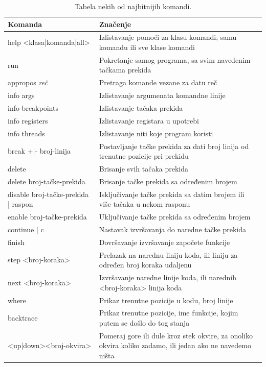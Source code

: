 \documentclass[a4paper]{article}
\begin{document}
\begin{table}[!h!]
\begin{center}
\caption{Tabela nekih od najbitnijih komandi.}
\begin{tabular}{|p{4cm}|p{6cm}|} \hline
Komanda & Značenje\\ \hline
help <klasa|komanda|all> & Izlistavanje pomoći za klasu komandi, samu komandu ili sve klase komandi\\ \hline
run & Pokretanje samog programa, sa svim navedenim tačkama prekida \\ \hline
appropos \textit{reč} & Pretraga komande vezane za datu reč\\ \hline
info args & Izlistavanje argumenata komandne linije \\ \hline
info breakpoints & Izlistavanje tačaka prekida \\ \hline
info registers & Izlistavanje registara u upotrebi \\ \hline
info threads & Izlistavanje niti koje program koristi \\ \hline
break +|- broj-linija & Postavljanje tačke prekida za dati broj linija od trenutne pozicije pri prekidu \\ \hline
delete & Brisanje svih tačaka prekida \\ \hline
delete broj-tačke-prekida & Brisanje tačke prekida sa određenim brojem \\ \hline
disable broj-tačke-prekida | raspon & Isključivanje tačke prekida sa datim brojem ili više tačaka u nekom rasponu \\ \hline
enable broj-tačke-prekida & Uključivanje tačke prekida sa određenim brojem \\ \hline
continue | c & Nastavak izvršavanja do naredne tačke prekida \\ \hline
finish & Dovršavanje izvršavanje započete funkcije \\ \hline
step <broj-koraka> & Prelazak na narednu liniju koda, ili liniju za određen broj koraka udaljenu \\ \hline
next <broj-koraka> & Izvršavanje naredne linije koda, ili narednih <broj-koraka> linija koda \\ \hline
where & Prikaz trenutne pozicije u kodu, broj linije \\ \hline
backtrace & Prikaz trenutne pozicije, ime funkcije, kojim putem se došlo do tog stanja\\ \hline
<up|down><broj-okvira> & Pomeraj gore ili dule kroz stek okvire, za onoliko okvira koliko zadamo, ili jedan ako ne navedemo ništa \\ \hline
\end{tabular}
\label{tab:tabelaKonzola}
\end{center}
\end{table}
\end{document}
